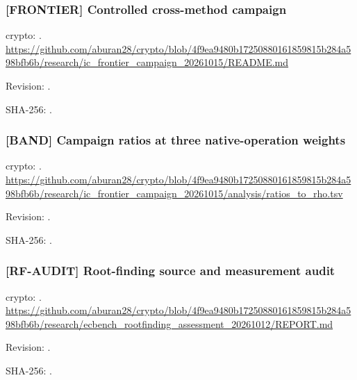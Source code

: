 \par\noindent\begin{minipage}{\linewidth}\small
\subsubsection*{[FRONTIER] Controlled cross-method campaign}\label{art:FRONTIER}
crypto: .
\url{https://github.com/aburan28/crypto/blob/4f9ea9480b17250880161859815b284a598bfb6b/research/ic_frontier_campaign_20261015/README.md}
\par Revision: .
\par SHA-256: .
\end{minipage}\par\medskip

\par\noindent\begin{minipage}{\linewidth}\small
\subsubsection*{[BAND] Campaign ratios at three native-operation weights}\label{art:BAND}
crypto: .
\url{https://github.com/aburan28/crypto/blob/4f9ea9480b17250880161859815b284a598bfb6b/research/ic_frontier_campaign_20261015/analysis/ratios_to_rho.tsv}
\par Revision: .
\par SHA-256: .
\end{minipage}\par\medskip

\par\noindent\begin{minipage}{\linewidth}\small
\subsubsection*{[RF-AUDIT] Root-finding source and measurement audit}\label{art:RF-AUDIT}
crypto: .
\url{https://github.com/aburan28/crypto/blob/4f9ea9480b17250880161859815b284a598bfb6b/research/ecbench_rootfinding_assessment_20261012/REPORT.md}
\par Revision: .
\par SHA-256: .
\end{minipage}\par\medskip

